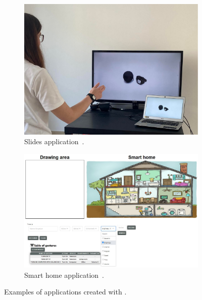 \begin{figure}[ht]
    \begin{subfigure}{.455\textwidth}
        \centering
        \includegraphics[width=\linewidth,trim={0 0 1cm 0cm},clip]{Figures/QuantumLeap/Applications/slides-prototype.pdf}  
        \vspace{-15pt}
        \captionsetup{width=.9\linewidth}
        \caption{Slides application~\cite{Steeman:2022}.}
        \label{fig:quantumleap:apps:slides}
    \end{subfigure}
    \begin{subfigure}{.535\textwidth}
        \centering
        \includegraphics[width=\linewidth,trim={0.1cm 0.1cm 0.1cm 0.1cm},clip]{Figures/QuantumLeap/Applications/smart-home-prototype.pdf}  
        \vspace{-15pt}
        \captionsetup{width=.9\linewidth}
        \caption{Smart home application~\cite{Moinnet:2022}.}
        \label{fig:quantumleap:apps:smart-home}
    \end{subfigure}

    \vspace{-8pt}
    \caption{Examples of applications created with \ql.}
    \label{fig:quantumleap:apps}
    \vspace{-12pt}
\end{figure}


